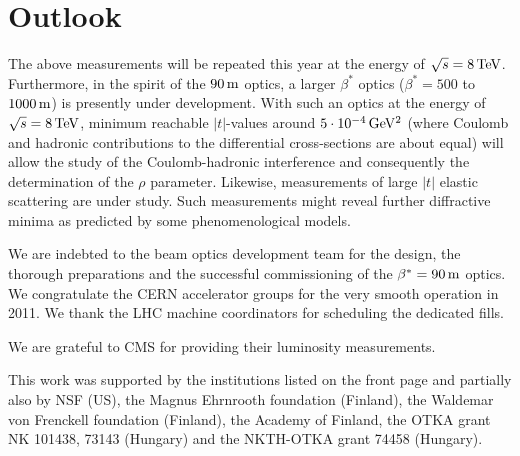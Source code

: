\documentclass[doublecol]{epl/epl2}
\def\un#1{\,{\rm #1}}
\begin{document}
\section{Outlook}

The above measurements will be repeated this year at the energy of $\sqrt s = 8\un{TeV}$. Furthermore, in the spirit of the $90\un{m}$ optics, a larger $\beta^*$ optics ($\beta^* = 500$ to $1000\un{m}$) is presently under development. With such an optics at the energy of $\sqrt s = 8\un{TeV}$, minimum reachable $|t|$-values around  $5\cdot 10^{-4}\un{GeV^2}$ (where Coulomb and hadronic contributions to the differential cross-sections are about equal) will allow the study of the Coulomb-hadronic interference and consequently the determination of the $\rho$ parameter. Likewise, measurements of large $|t|$ elastic scattering are under study. Such measurements might reveal further diffractive minima as predicted by some phenomenological models.



\acknowledgments

We are indebted to the beam optics development team
for the design, the thorough preparations and the successful commissioning of the $\beta^* = 90\un{m}$ optics. We congratulate the CERN accelerator groups for the very smooth operation in 2011. We thank
the LHC machine coordinators for scheduling the dedicated fills.

We are grateful to CMS for providing their luminosity measurements.

This work was supported by the institutions listed on the front page and partially also by NSF (US), the Magnus
Ehrnrooth foundation (Finland), the Waldemar von Frenckell foundation (Finland), the Academy of
Finland, the OTKA grant NK 101438, 73143 (Hungary) and the NKTH-OTKA grant 74458 (Hungary).
\end{document}
